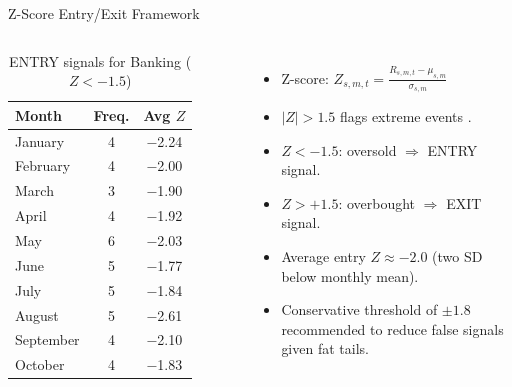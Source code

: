\documentclass[10pt, aspectratio=169]{beamer}
\begin{document}
\begin{frame}{Z-Score Entry/Exit Framework}
\begin{columns}[T]
\begin{table}
\centering
\caption{\scriptsize ENTRY signals for Banking ($Z < -1.5$)}
\scriptsize
\begin{tabular}{lcc}
\toprule
Month & Freq. & Avg $Z$ \\
\midrule
January   & 4 & $-$2.24 \\
February  & 4 & $-$2.00 \\
March     & 3 & $-$1.90 \\
April     & 4 & $-$1.92 \\
May       & 6 & $-$2.03 \\
June      & 5 & $-$1.77 \\
July      & 5 & $-$1.84 \\
August    & 5 & $-$2.61 \\
September & 4 & $-$2.10 \\
October   & 4 & $-$1.83 \\
\bottomrule
\end{tabular}
\end{table}
\begin{itemize}
    \item Z-score: $Z_{s,m,t} = \frac{R_{s,m,t} - \mu_{s,m}}{\sigma_{s,m}}$
    \item $|Z|>1.5$ flags extreme events \cite{tsay2010analysis}.
    \item $Z<-1.5$: oversold $\Rightarrow$ ENTRY signal.
    \item $Z>+1.5$: overbought $\Rightarrow$ EXIT signal.
    \item Average entry $Z \approx -2.0$ (two SD below monthly mean).
    \item Conservative threshold of $\pm 1.8$ recommended to reduce false signals given fat tails.
\end{itemize}
\end{columns}
\end{frame}
\end{document}
